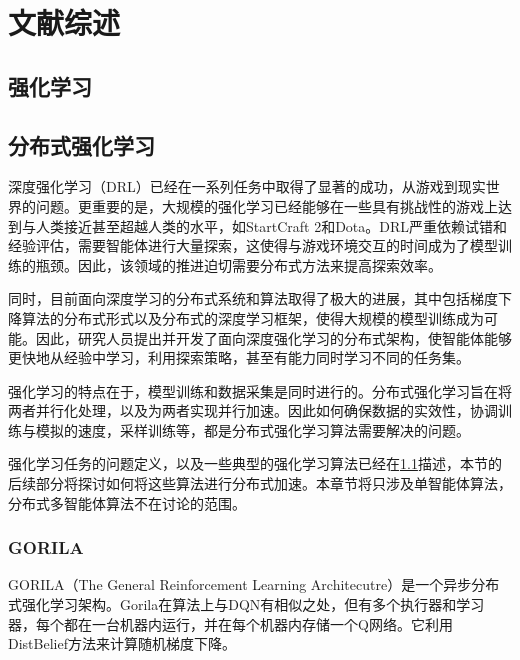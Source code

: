 \chapter{文献综述}



\section{强化学习}
\label{sec:review_rl}

\section{分布式强化学习}

深度强化学习（DRL）已经在一系列任务中取得了显著的成功，从游戏\cite{silver2016mastering,silver2017mastering}到现实世界的问题\cite{jumper2021highly}。更重要的是，大规模的强化学习已经能够在一些具有挑战性的游戏上达到与人类接近甚至超越人类的水平，如StartCraft 2\cite{vinyals2019grandmaster}和Dota\cite{berner2019dota}。DRL严重依赖试错和经验评估，需要智能体进行大量探索，这使得与游戏环境交互的时间成为了模型训练的瓶颈。因此，该领域的推进迫切需要分布式方法来提高探索效率。

同时，目前面向深度学习的分布式系统和算法取得了极大的进展，其中包括梯度下降算法的分布式形式以及分布式的深度学习框架\cite{goyal2017accurate, you2017scaling}，使得大规模的模型训练成为可能。因此，研究人员提出并开发了面向深度强化学习的分布式架构，使智能体能够更快地从经验中学习，利用探索策略，甚至有能力同时学习不同的任务集。

强化学习的特点在于，模型训练和数据采集是同时进行的。分布式强化学习旨在将两者并行化处理，以及为两者实现并行加速。因此如何确保数据的实效性，协调训练与模拟的速度，采样训练等，都是分布式强化学习算法需要解决的问题。

强化学习任务的问题定义，以及一些典型的强化学习算法已经在\ref{sec:review_rl}描述，本节的后续部分将探讨如何将这些算法进行分布式加速。本章节将只涉及单智能体算法，分布式多智能体算法不在讨论的范围。

\subsection{GORILA}

GORILA（The General Reinforcement Learning Architecutre）\cite{nair2015massively}是一个异步分布式强化学习架构。Gorila在算法上与DQN有相似之处，但有多个执行器和学习器，每个都在一台机器内运行，并在每个机器内存储一个Q网络。它利用DistBelief方法\cite{dean2012large}来计算随机梯度下降。

